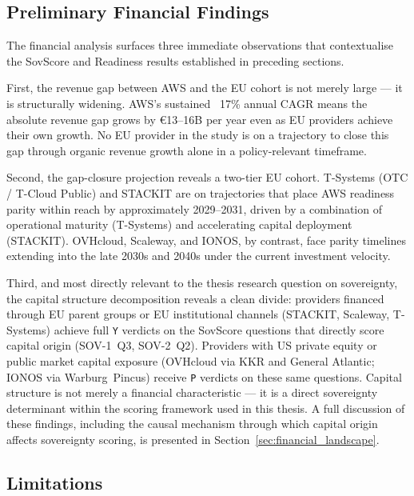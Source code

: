 \subsection{Preliminary Financial Findings}
\label{subsec:financial_preliminary}

The financial analysis surfaces three immediate observations that contextualise the SovScore and Readiness results established in preceding sections.

First, the revenue gap between AWS and the EU cohort is not merely large --- it is structurally widening. AWS's sustained ~17\% annual CAGR means the absolute revenue gap grows by €13--16B per year even as EU providers achieve their own growth. No EU provider in the study is on a trajectory to close this gap through organic revenue growth alone in a policy-relevant timeframe.

Second, the gap-closure projection reveals a two-tier EU cohort. T-Systems (OTC / T-Cloud Public) and STACKIT are on trajectories that place AWS readiness parity within reach by approximately 2029--2031, driven by a combination of operational maturity (T-Systems) and accelerating capital deployment (STACKIT). OVHcloud, Scaleway, and IONOS, by contrast, face parity timelines extending into the late 2030s and 2040s under the current investment velocity.

Third, and most directly relevant to the thesis research question on sovereignty, the capital structure decomposition reveals a clean divide: providers financed through EU parent groups or EU institutional channels (STACKIT, Scaleway, T-Systems) achieve full \texttt{Y} verdicts on the SovScore questions that directly score capital origin (SOV-1~Q3, SOV-2~Q2). Providers with US private equity or public market capital exposure (OVHcloud via KKR and General Atlantic; IONOS via Warburg~Pincus) receive \texttt{P} verdicts on these same questions. Capital structure is not merely a financial characteristic --- it is a direct sovereignty determinant within the scoring framework used in this thesis. A full discussion of these findings, including the causal mechanism through which capital origin affects sovereignty scoring, is presented in Section~\ref{sec:financial_landscape}.

\subsection{Limitations}
\label{subsec:financial_limitations}

